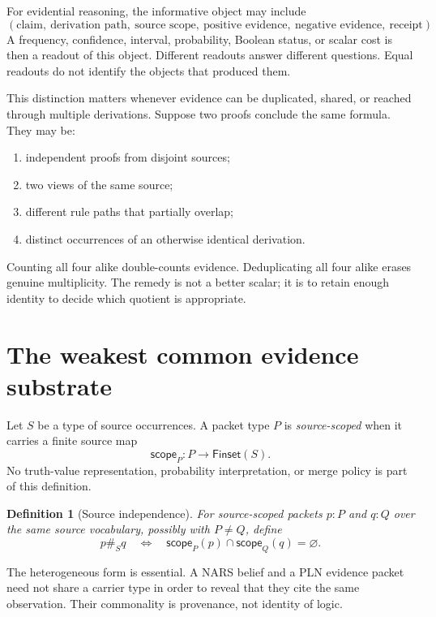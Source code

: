 \documentclass[11pt]{article}
\newtheorem{definition}{Definition}[section]
\theoremstyle{remark}
\newcommand{\Finset}{\mathsf{Finset}}
\newcommand{\Scope}{\mathsf{scope}}
\begin{document}
For evidential reasoning, the informative object may include
\[
  (\text{claim},\ \text{derivation path},\ \text{source scope},\
    \text{positive evidence},\ \text{negative evidence},\ \text{receipt}).
\]
A frequency, confidence, interval, probability, Boolean status, or scalar cost
is then a readout of this object.  Different readouts answer different
questions.  Equal readouts do not identify the objects that produced them.

This distinction matters whenever evidence can be duplicated, shared, or
reached through multiple derivations.  Suppose two proofs conclude the same
formula.  They may be:
\begin{enumerate}[label=(\alph*)]
  \item independent proofs from disjoint sources;
  \item two views of the same source;
  \item different rule paths that partially overlap;
  \item distinct occurrences of an otherwise identical derivation.
\end{enumerate}
Counting all four alike double-counts evidence.  Deduplicating all four alike
erases genuine multiplicity.  The remedy is not a better scalar; it is to
retain enough identity to decide which quotient is appropriate.

\section{The weakest common evidence substrate}

Let $S$ be a type of source occurrences.  A packet type $P$ is
\emph{source-scoped} when it carries a finite source map
\[
  \Scope_P : P \longrightarrow \Finset(S).
\]
No truth-value representation, probability interpretation, or merge policy is
part of this definition.

\begin{definition}[Source independence]
For source-scoped packets $p : P$ and $q : Q$ over the same source vocabulary,
possibly with $P\neq Q$, define
\[
  p \mathrel{\#_S} q
  \quad\Longleftrightarrow\quad
  \Scope_P(p)\cap\Scope_Q(q)=\varnothing.
\]
\end{definition}

The heterogeneous form is essential.  A NARS belief and a PLN evidence packet
need not share a carrier type in order to reveal that they cite the same
observation.  Their commonality is provenance, not identity of logic.
\end{document}
